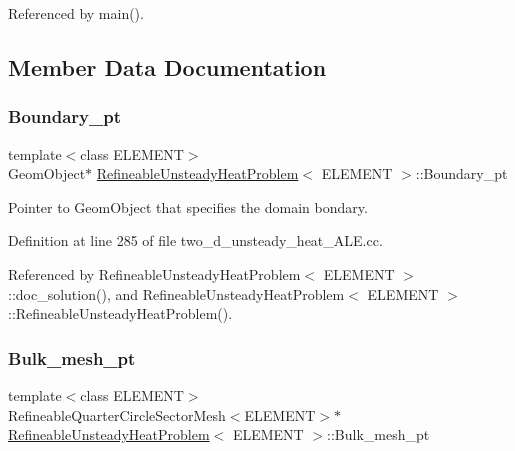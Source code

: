 Referenced by main().



\subsection{Member Data Documentation}
\mbox{\label{classRefineableUnsteadyHeatProblem_a368512778fbfd59e918104340466b1df}} 
\subsubsection{\texorpdfstring{Boundary\+\_\+pt}{Boundary\_pt}}
{\footnotesize\ttfamily template$<$class E\+L\+E\+M\+E\+NT$>$ \\
Geom\+Object$\ast$ \hyperlink{classRefineableUnsteadyHeatProblem}{Refineable\+Unsteady\+Heat\+Problem}$<$ E\+L\+E\+M\+E\+NT $>$\+::Boundary\+\_\+pt\hspace{0.3cm}{\ttfamily [private]}}



Pointer to Geom\+Object that specifies the domain bondary. 



Definition at line 285 of file two\+\_\+d\+\_\+unsteady\+\_\+heat\+\_\+\+A\+L\+E.\+cc.



Referenced by Refineable\+Unsteady\+Heat\+Problem$<$ E\+L\+E\+M\+E\+N\+T $>$\+::doc\+\_\+solution(), and Refineable\+Unsteady\+Heat\+Problem$<$ E\+L\+E\+M\+E\+N\+T $>$\+::\+Refineable\+Unsteady\+Heat\+Problem().

\mbox{\label{classRefineableUnsteadyHeatProblem_afade341e03a4c97e62444c80adc9552f}} 
\subsubsection{\texorpdfstring{Bulk\+\_\+mesh\+\_\+pt}{Bulk\_mesh\_pt}}
{\footnotesize\ttfamily template$<$class E\+L\+E\+M\+E\+NT$>$ \\
Refineable\+Quarter\+Circle\+Sector\+Mesh$<$E\+L\+E\+M\+E\+NT$>$$\ast$ \hyperlink{classRefineableUnsteadyHeatProblem}{Refineable\+Unsteady\+Heat\+Problem}$<$ E\+L\+E\+M\+E\+NT $>$\+::Bulk\+\_\+mesh\+\_\+pt\hspace{0.3cm}{\ttfamily [private]}}



